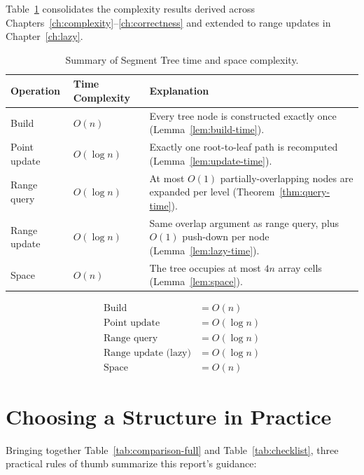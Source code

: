 \documentclass[
  11pt,
  a4paper,
  twoside=false,
  numbers=noenddot,
  headings=big,
  parskip=half,
  toc=bibliography,
  toc=listof,
  bibliography=totoc
]{scrreprt}
\newcommand{\Oh}[1]{O\!\left(#1\right)}
\newcommand{\tblhead}[1]{\textbf{\sffamily #1}}
\begin{document}
Table~\ref{tab:summary} consolidates the complexity results derived across Chapters~\ref{ch:complexity}--\ref{ch:correctness} and extended to range updates in Chapter~\ref{ch:lazy}.

\begin{table}[H]
\centering
\caption{Summary of Segment Tree time and space complexity.}
\label{tab:summary}
\begin{tabular}{llp{6.2cm}}
\toprule
\tblhead{Operation} & \tblhead{Time Complexity} & \tblhead{Explanation} \\
\midrule
Build          & $\Oh{n}$      & Every tree node is constructed exactly once (Lemma~\ref{lem:build-time}). \\
Point update   & $\Oh{\log n}$ & Exactly one root-to-leaf path is recomputed (Lemma~\ref{lem:update-time}). \\
Range query    & $\Oh{\log n}$ & At most $\Oh{1}$ partially-overlapping nodes are expanded per level (Theorem~\ref{thm:query-time}). \\
Range update   & $\Oh{\log n}$ & Same overlap argument as range query, plus $\Oh{1}$ push-down per node (Lemma~\ref{lem:lazy-time}). \\
Space          & $\Oh{n}$      & The tree occupies at most $4n$ array cells (Lemma~\ref{lem:space}). \\
\bottomrule
\end{tabular}
\end{table}

\begin{equation}
\boxed{
\begin{aligned}
\text{Build} &= \Oh{n} \\
\text{Point update} &= \Oh{\log n} \\
\text{Range query} &= \Oh{\log n} \\
\text{Range update (lazy)} &= \Oh{\log n} \\
\text{Space} &= \Oh{n}
\end{aligned}}
\end{equation}

\section{Choosing a Structure in Practice}
Bringing together Table~\ref{tab:comparison-full} and Table~\ref{tab:checklist}, three practical rules of thumb summarize this report's guidance:
\end{document}
